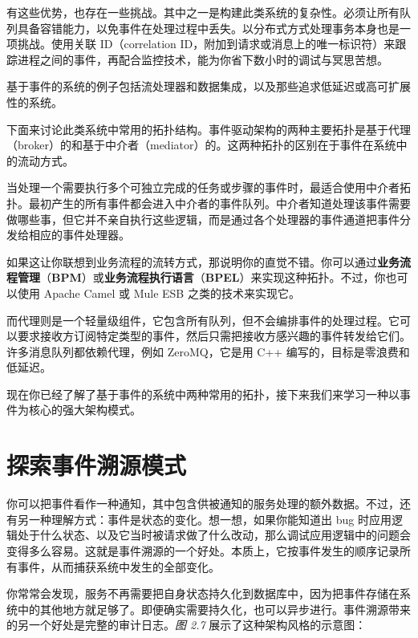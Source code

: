 有这些优势，也存在一些挑战。其中之一是构建此类系统的复杂性。必须让所有队列具备容错能力，以免事件在处理过程中丢失。以分布式方式处理事务本身也是一项挑战。使用关联 ID（correlation ID，附加到请求或消息上的唯一标识符）来跟踪进程之间的事件，再配合监控技术，能为你省下数小时的调试与冥思苦想。

基于事件的系统的例子包括流处理器和数据集成，以及那些追求低延迟或高可扩展性的系统。

下面来讨论此类系统中常用的拓扑结构。事件驱动架构的两种主要拓扑是基于代理（broker）的和基于中介者（mediator）的。这两种拓扑的区别在于事件在系统中的流动方式。

当处理一个需要执行多个可独立完成的任务或步骤的事件时，最适合使用中介者拓扑。最初产生的所有事件都会进入中介者的事件队列。中介者知道处理该事件需要做哪些事，但它并不亲自执行这些逻辑，而是通过各个处理器的事件通道把事件分发给相应的事件处理器。

\label{idx:111}
\label{idx:112}
\label{idx:113}
如果这让你联想到业务流程的流转方式，那说明你的直觉不错。你可以通过\textbf{业务流程管理}（\textbf{BPM}）或\textbf{业务流程执行语言}（\textbf{BPEL}）来实现这种拓扑。不过，你也可以使用 Apache Camel 或 Mule ESB 之类的技术来实现它。


而代理则是一个轻量级组件，它包含所有队列，但不会编排事件的处理过程。它可以要求接收方订阅特定类型的事件，然后只需把接收方感兴趣的事件转发给它们。许多消息队列都依赖代理，例如 ZeroMQ，它是用 C++ 编写的，目标是零浪费和低延迟。


\label{idx:114}
现在你已经了解了基于事件的系统中两种常用的拓扑，接下来我们来学习一种以事件为核心的强大架构模式。

\section{探索事件溯源模式}

\label{idx:115}
你可以把事件看作一种通知，其中包含供被通知的服务处理的额外数据。不过，还有另一种理解方式：事件是状态的变化。想一想，如果你能知道出 bug 时应用逻辑处于什么状态、以及它当时被请求做了什么改动，那么调试应用逻辑中的问题会变得多么容易。这就是事件溯源的一个好处。本质上，它按事件发生的顺序记录所有事件，从而捕获系统中发生的全部变化。

\label{idx:116}
你常常会发现，服务不再需要把自身状态持久化到数据库中，因为把事件存储在系统中的其他地方就足够了。即便确实需要持久化，也可以异步进行。事件溯源带来的另一个好处是完整的审计日志。\emph{图 2.7} 展示了这种架构风格的示意图：

